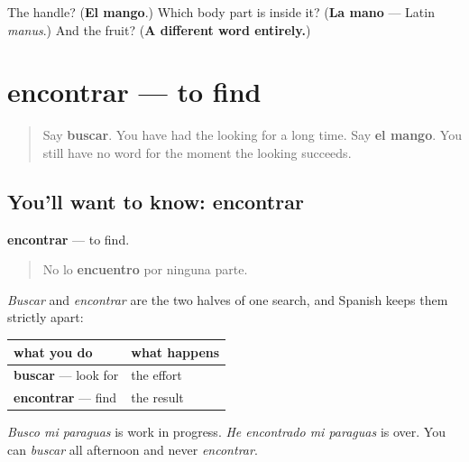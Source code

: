 \begin{tcolorbox}[breakable,colback=teal!4,colframe=teal!35!black,title={Before you move on}]
The handle? (\textbf{El mango}.) Which body part is inside it? (\textbf{La mano} — Latin \emph{manus}.) And the fruit? (\textbf{A different word entirely.})
\end{tcolorbox}
\section[encontrar]{encontrar — to find}

\label{lesson:ES-C470-encontrar}



\begin{quote}
Say \textbf{buscar}. You have had the looking for a long time. Say \textbf{el mango}. You still have no word for the moment the looking succeeds.
\end{quote}

\subsection*{You'll want to know: encontrar}
\textbf{encontrar} — to find.

\begin{quote}
No lo \textbf{encuentro} por ninguna parte.
\end{quote}

\emph{Buscar} and \emph{encontrar} are the two halves of one search, and Spanish keeps them strictly apart:

\noindent
\begin{tabularx}{\linewidth}{@{}>{\raggedright\arraybackslash}X>{\raggedright\arraybackslash}X@{}}
\toprule
\textbf{what you do} & \textbf{what happens} \\
\midrule
\textbf{buscar} — look for & the effort \\
\textbf{encontrar} — find & the result \\
\bottomrule
\end{tabularx}

\emph{Busco mi paraguas} is work in progress. \emph{He encontrado mi paraguas} is over. You can \emph{buscar} all afternoon and never \emph{encontrar}.

